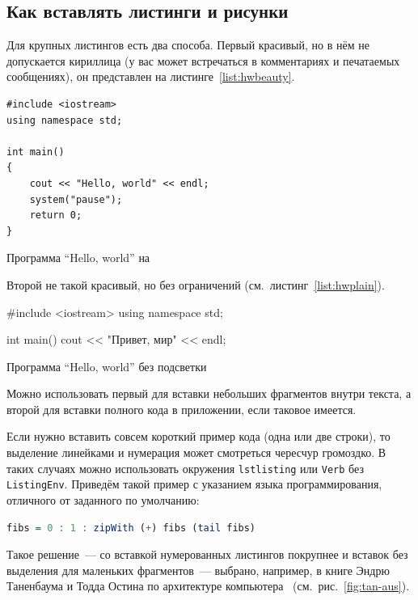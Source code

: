 \subsection{Как вставлять листинги и рисунки}
Для крупных листингов есть два способа. Первый красивый, но в нём не допускается
кириллица (у вас может встречаться в комментариях и
печатаемых сообщениях), он представлен на листинге~\ref{list:hwbeauty}.
\begin{ListingEnv}[H]%
\begin{lstlisting}
#include <iostream>
using namespace std;

int main()
{
    cout << "Hello, world" << endl;
    system("pause");
    return 0;
}
\end{lstlisting}
\caption{Программа “Hello, world” на \protect\cpp}
\label{list:hwbeauty}
\end{ListingEnv}

Второй не такой красивый, но без ограничений (см.~листинг~\ref{list:hwplain}).
\begin{ListingEnv}[H]
\begin{Verb}

#include <iostream>
using namespace std;

int main()
{
    cout << "Привет, мир" << endl;
}
\end{Verb}
\caption{Программа “Hello, world” без подсветки}
\label{list:hwplain}
\end{ListingEnv}

Можно использовать первый для вставки небольших фрагментов
внутри текста, а второй для вставки полного
кода в приложении, если таковое имеется.

Если нужно вставить совсем короткий пример кода (одна или две строки), то выделение  линейками и нумерация может смотреться чересчур громоздко. В таких случаях можно использовать окружения \texttt{lstlisting} или \texttt{Verb} без \texttt{ListingEnv}. Приведём такой пример с указанием языка программирования, отличного от заданного по умолчанию:
\begin{lstlisting}[language=Haskell]
fibs = 0 : 1 : zipWith (+) fibs (tail fibs)
\end{lstlisting}
Такое решение~--- со вставкой нумерованных листингов покрупнее
и вставок без выделения для маленьких фрагментов~--- выбрано,
например, в книге Эндрю Таненбаума и Тодда Остина по архитектуре
компьютера~\autocite{TanAus2013} (см.~рис.~\ref{fig:tan-aus}).

